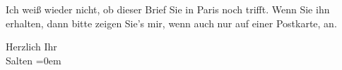 \pstart
           Ich weiß wieder nicht, ob dieser Brief Sie in Paris noch trifft. Wenn Sie ihn erhalten, dann bitte zeigen Sie’s mir, wenn
               auch nur auf einer Postkarte, an.\pend
           
\pstart
           Herzlich Ihr {\\[\baselineskip]}\spacefill\mbox{Salten}\pend
           \leftskip=0em{}\endnumbering{}  \newcommand{\dateiname}{L03266}\newcommand{\titel}{Felix Salten an Arthur Schnitzler, 23. 5. 1897}\newcommand{\editorInnen}{Martin Anton Müller und Laura Untner}

